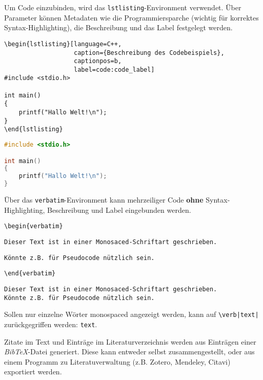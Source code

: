 
Um Code einzubinden, wird das \verb|lstlisting|-Environment verwendet.
Über Parameter können Metadaten wie die Programmiersparche (wichtig für korrektes Syntax-Highlighting), die Beschreibung und das Label festgelegt werden.

\begin{verbatim}
\begin{lstlisting}[language=C++,
                   caption={Beschreibung des Codebeispiels},
                   captionpos=b,
                   label=code:code_label]
#include <stdio.h>

int main()
{
    printf("Hallo Welt!\n");
}
\end{lstlisting}
\end{verbatim}

\begin{lstlisting}[language=C++,
                   caption={Beschreibung des Codebeispiels},
                   captionpos=b,
                   label=code:code_label]
#include <stdio.h>

int main()
{
    printf("Hallo Welt!\n");
}
\end{lstlisting}

Über das \verb|verbatim|-Environment kann mehrzeiliger Code \textbf{ohne} Syntax-Highlighting, Beschreibung und Label eingebunden werden.

\verb|\begin{verbatim}|

\verb|Dieser Text ist in einer Monosaced-Schriftart geschrieben.|

\verb|Könnte z.B. für Pseudocode nützlich sein.|

\verb|\end{verbatim}|

\begin{verbatim}
Dieser Text ist in einer Monosaced-Schriftart geschrieben.
Könnte z.B. für Pseudocode nützlich sein.
\end{verbatim}

Sollen nur einzelne Wörter monospaced angezeigt werden, kann auf \verb!\verb|text|! zurückgegriffen werden: \verb|text|.



Zitate im Text und Einträge im Literaturverzeichnis werden aus Einträgen einer \textit{BibTeX}-Datei generiert.
Diese kann entweder selbst zusammengestellt, oder aus einem Programm zu Literatuverwaltung (z.B. Zotero, Mendeley, Citavi) exportiert werden.

